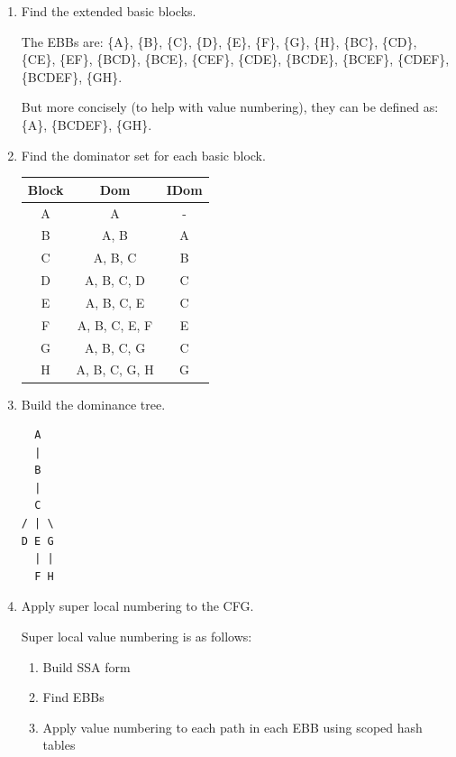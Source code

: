 \documentclass[11pt]{article}
\begin{document}
\begin{enumerate}
	\item Find the extended basic blocks.
	      \begin{Answer}
		      The EBBs are:
		      \{A\}, \{B\}, \{C\}, \{D\}, \{E\}, \{F\}, \{G\}, \{H\}, \{BC\}, \{CD\}, \{CE\}, \{EF\}, \{BCD\}, \{BCE\}, \{CEF\}, \{CDE\}, \{BCDE\}, \{BCEF\}, \{CDEF\}, \{BCDEF\}, \{GH\}.

		      But more concisely (to help with value numbering), they can be defined as: \{A\}, \{BCDEF\}, \{GH\}.
	      \end{Answer}
	\item Find the dominator set for each basic block.
	      \begin{Answer}
		      \begin{center}
			      \begin{tabular}{ |c|c|c| }
				      \hline
				      Block & Dom           & IDom \\ [0.5ex] %
				      \hline
				      A     & A             & -    \\
				      B     & A, B          & A    \\
				      C     & A, B, C       & B    \\
				      D     & A, B, C, D    & C    \\
				      E     & A, B, C, E    & C    \\
				      F     & A, B, C, E, F & E    \\
				      G     & A, B, C, G    & C    \\
				      H     & A, B, C, G, H & G    \\
				      \hline
			      \end{tabular}
		      \end{center}
	      \end{Answer}
	\item Build the dominance tree.
	      \begin{Answer}
		      \begin{verbatim}
  A
  |
  B
  |
  C
/ | \
D E G
  | |
  F H
\end{verbatim}
	      \end{Answer}
	\item Apply super local numbering to the CFG.
	      \begin{Answer}
		      Super local value numbering is as follows:
		      \begin{enumerate}[i]
			      \item Build SSA form
			      \item Find EBBs
			      \item Apply value numbering to each path in each EBB using scoped hash tables
		      \end{enumerate}


\end{Answer}
\end{enumerate}
\end{document}
